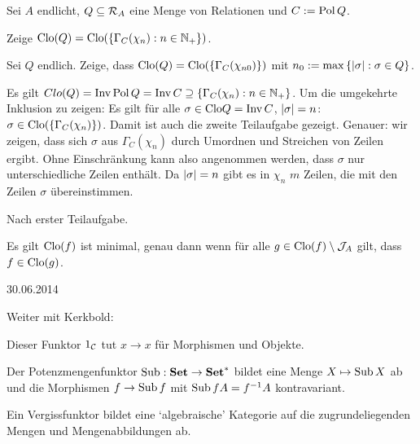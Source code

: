\documentclass{book}
\begin{document}
\begin{exercise}
    Sei $A$ endlicht, $Q\subseteq \mathcal{R}_A$ eine Menge von Relationen und $C:=\mathop\mathrm{Pol} Q$.
    \begin{tasks}
            \item Zeige $\mathrm{Clo}(Q)=\mathrm{Clo}(\left\{\Gamma_C(\chi_n):n\in\mathbb{N}_+\right\})$.
        \item Sei $Q$ endlich. Zeige, dass $\mathrm{Clo}(Q)=\mathrm{Clo}(\left\{\Gamma_C(\chi_{n0})\right\})$ mit $n_0:=\max\left\{\left|\sigma\right| : \sigma\in Q\right\}$.
    \end{tasks}
\end{exercise}

\begin{solution}
    \begin{tasks}
            \item Es gilt $Clo(Q)=\mathop\mathrm{Inv}\mathop\mathrm{Pol} Q=\mathop\mathrm{Inv} C\supseteq \left\{\Gamma_C(\chi_n):n\in\mathbb{N}_+\right\}$. Um die umgekehrte Inklusion zu zeigen: Es gilt für alle $\sigma\in\mathrm{Clo} Q=\mathop\mathrm{Inv} C$, $\left|\sigma\right|=n$: $\sigma\in\mathrm{Clo}(\left\{\Gamma_C(\chi_n)\right\})$. Damit ist auch die zweite Teilaufgabe gezeigt.
        Genauer: wir zeigen, dass sich $\sigma$ aus $\Gamma_C(\chi_n)$ durch Umordnen und Streichen von Zeilen ergibt. Ohne Einschränkung kann also angenommen werden, dass $\sigma$ nur unterschiedliche Zeilen enthält. Da $\left|\sigma\right|=n$ gibt es in $\chi_n$ $m$ Zeilen, die mit den Zeilen $\sigma$ übereinstimmen.
        \item Nach erster Teilaufgabe.
    \end{tasks}
\end{solution}

\begin{remark}
    Es gilt $\mathrm{Clo}(f)$ ist minimal, genau dann wenn für alle $g\in\mathrm{Clo}(f)\setminus\mathcal{J}_A$ gilt, dass $f\in\mathrm{Clo}(g)$. 
\end{remark}

\hfill{30.06.2014}

Weiter mit Kerkbold:

\begin{example}[Identitätsfunktor]
    Dieser Funktor $1_{\mathcal{C}}$ tut $x\to x$ für Morphismen und Objekte.    
\end{example}

\begin{example}[Potenzmengenfunktor]
    Der Potenzmengenfunktor $\mathop\mathrm{Sub}\nolimits:\mathbf{Set}\rightarrow\mathbf{Set}^{\ast}$ bildet eine Menge $X\mapsto\mathop\mathrm{Sub}\nolimits X$ ab und die Morphismen $f\rightarrow \mathop\mathrm{Sub}\nolimits f$ mit $\mathop\mathrm{Sub}\nolimits f A = f^{-1} A$ kontravariant.
\end{example}

\begin{example}[Vergissfunktor]
    Ein Vergissfunktor bildet eine `algebraische' Kategorie auf die zugrundeliegenden Mengen und Mengenabbildungen ab.
\end{example}
\end{document}
